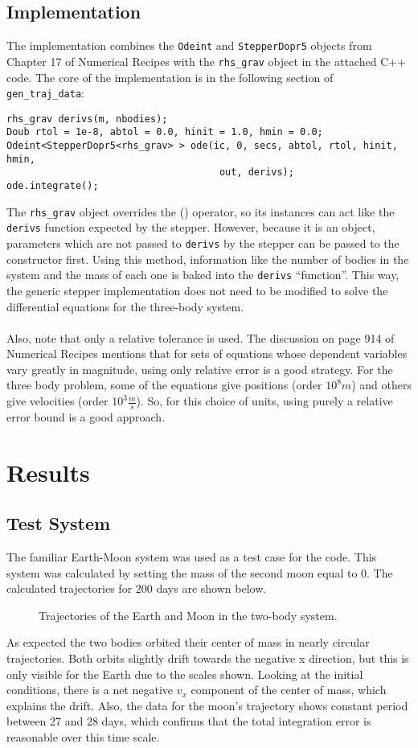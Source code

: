 \documentclass[12pt]{article}
\begin{document}
\subsection{Implementation}
The implementation combines the \texttt{Odeint} and \texttt{StepperDopr5} objects from Chapter 17 of Numerical Recipes \cite{numericalrecipes} with the \texttt{rhs\_grav} object in the attached C++ code. The core of the implementation is in the following section of \texttt{gen\_traj\_data}:
\begin{lstlisting}
rhs_grav derivs(m, nbodies);
Doub rtol = 1e-8, abtol = 0.0, hinit = 1.0, hmin = 0.0;
Odeint<StepperDopr5<rhs_grav> > ode(ic, 0, secs, abtol, rtol, hinit, hmin,
                                     out, derivs);
ode.integrate();
\end{lstlisting}
The \texttt{rhs\_grav} object overrides the () operator, so its instances can act like the \texttt{derivs} function expected by the stepper. However, because it is an object, parameters which are not passed to \texttt{derivs} by the stepper can be passed to the constructor first. Using this method, information like the number of bodies in the system and the mass of each one is baked into the \texttt{derivs} ``function''. This way, the generic stepper implementation does not need to be modified to solve the differential equations for the three-body system. \\ \\
Also, note that only a relative tolerance is used. The discussion on page 914 of Numerical Recipes \cite{numericalrecipes} mentions that for sets of equations whose dependent variables vary greatly in magnitude, using only relative error is a good strategy. For the three body problem, some of the equations give positions (order $10^8m$) and others give velocities (order $10^3\frac{m}{s}$). So, for this choice of units, using purely a relative error bound is a good approach.
\section{Results}
\subsection{Test System}
The familiar Earth-Moon system was used as a test case for the code. This system was calculated by setting the mass of the second moon equal to 0. The calculated trajectories for 200 days are shown below.
\begin{figure}[H]
 \qquad
{} \qquad
\caption{Trajectories of the Earth and Moon in the two-body system.}
\end{figure}
As expected the two bodies orbited their center of mass in nearly circular trajectories. Both orbits slightly drift towards the negative x direction, but this is only visible for the Earth due to the scales shown. Looking at the initial conditions, there is a net negative $v_x$ component of the center of mass, which explains the drift. Also, the data for the moon's trajectory shows constant period between 27 and 28 days, which confirms that the total integration error is reasonable over this time scale.
\end{document}
